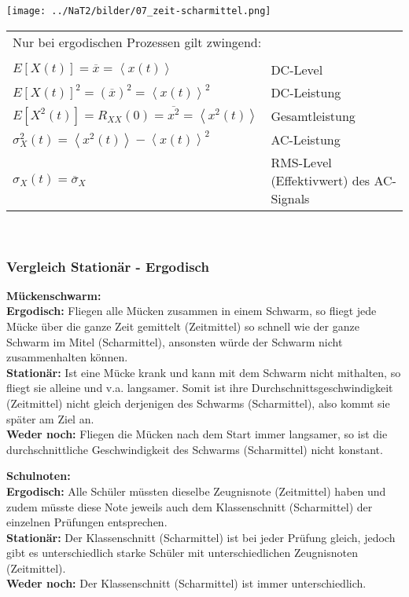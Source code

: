 	\begin{minipage}{5cm}
		\texttt{[image: ../NaT2/bilder/07\_zeit-scharmittel.png]}
  	\end{minipage}
	\begin{minipage}{13.5cm}

	\begin{tabular}{ll}
  		\multicolumn{2}{l}{Nur bei ergodischen Prozessen gilt zwingend:} \\ \\
      $E[X(t)] = \overline{x} = \left\langle x(t) \right\rangle$ & DC-Level \\
      $E[X(t)]^{2} = (\overline{x})^{2} = \left\langle x(t) \right\rangle^{2}$ & DC-Leistung \\
      $E[X^{2}(t)] = R_{XX}(0) = \overline{x^{2}} = 
                     \left\langle x^{2}(t) \right\rangle $ & Gesamtleistung \\
      $\sigma_{X}^{2}(t) = \left\langle x^{2}(t) \right\rangle 
                           - \left\langle x(t) \right\rangle^{2}$ & AC-Leistung \\
      $\sigma_{X}(t) = \overline{\sigma}_{X}$ & RMS-Level (Effektivwert) des AC-Signals\\
    \end{tabular} \\
  	\end{minipage}


\subsubsection{Vergleich Stationär - Ergodisch}
\textbf{Mückenschwarm:}\\
\textbf{Ergodisch:} Fliegen alle Mücken zusammen in einem Schwarm, so fliegt jede Mücke über die
ganze Zeit gemittelt (Zeitmittel) so schnell wie der ganze Schwarm im Mitel (Scharmittel), ansonsten
würde der Schwarm nicht zusammenhalten können. \\
\textbf{Stationär:} Ist eine Mücke krank und kann mit dem Schwarm nicht mithalten, so fliegt sie
alleine und v.a. langsamer. Somit ist ihre Durchschnittsgeschwindigkeit (Zeitmittel) nicht gleich
derjenigen des Schwarms (Scharmittel), also kommt sie später am Ziel an. \\
\textbf{Weder noch:} Fliegen die Mücken nach dem Start immer langsamer, so ist die
durchschnittliche Geschwindigkeit des Schwarms (Scharmittel) nicht konstant.

\textbf{Schulnoten:}\\
\textbf{Ergodisch:} Alle Schüler müssten dieselbe Zeugnisnote (Zeitmittel) haben und zudem müsste
diese Note jeweils auch dem Klassenschnitt (Scharmittel) der einzelnen Prüfungen entsprechen. \\
\textbf{Stationär:} Der Klassenschnitt (Scharmittel) ist bei jeder Prüfung gleich, jedoch gibt es
unterschiedlich starke Schüler mit unterschiedlichen Zeugnisnoten (Zeitmittel). \\
\textbf{Weder noch:} Der Klassenschnitt (Scharmittel) ist immer unterschiedlich.

